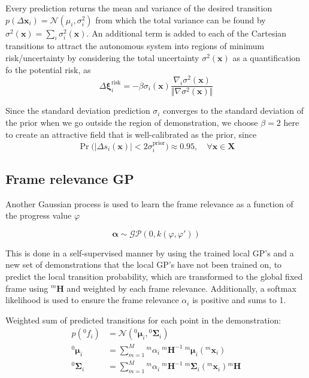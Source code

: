 Every prediction returns the mean and variance of the desired transition \( p(\Delta \boldsymbol{x}_i) = \mathcal{N}(\mu_i, \sigma_i^2) \) from which the total variance can be found by \( \sigma^2(\boldsymbol{x}) = \sum_{i} \sigma_i^2(\boldsymbol{x}) \).
An additional term is added to each of the Cartesian transitions to attract the autonomous system into regions of minimum risk/uncertainty by considering the total uncertainty \( \sigma^2(\boldsymbol{x}) \) as a quantification fo the potential risk, as
\begin{equation}
    \Delta \boldsymbol{\xi}_i^{\text{risk}} = - \beta \sigma_i(\boldsymbol{x}) \frac{\nabla_i \sigma^2(\boldsymbol{x})}{\Vert \nabla \sigma^2(\boldsymbol{x}) \Vert}
\end{equation}

Since the standard deviation prediction \( \sigma_i \) converges to the standard deviation of the prior when we go outside the region of demonstration, we choose \( \beta = 2 \) here to create an attractive field that is well-calibrated as the prior, since
\begin{equation}
    \Pr \Big( \big\vert \Delta s_i(\boldsymbol{x}) \big\vert < 2 \sigma_i^\text{prior} \Big) \approx 0.95, \quad \forall \boldsymbol{x} \in \boldsymbol{X}
\end{equation}

\subsection{Frame relevance GP}\label{sec:frame-relevance-gp}

Another Gaussian process is used to learn the frame relevance as a function of the progress value \( \varphi \)

\begin{equation}
    \boldsymbol{\alpha} \sim \mathcal{GP}(0, k(\varphi, \varphi'))
\end{equation}

This is done in a self-supervised manner by using the trained local GP's and a new set of demonstrations that the local GP's have not been trained on, to predict the local transition probability, which are transformed to the global fixed frame using \( {}^{m}\boldsymbol{H} \) and weighted by each frame relevance.
Additionally, a softmax likelihood is used to ensure the frame relevance \( \alpha_i \) is positive and sums to 1.

Weighted sum of predicted transitions for each point in the demonstration:
\begin{align}
    p \left( {}^{0}f_i \right)
     & =
    \mathcal{N} \left( {}^{0}\boldsymbol{\mu}_i, {}^{0}\boldsymbol{\Sigma}_i \right)
    \\
    {}^{0}\boldsymbol{\mu}_i
     & =
    \sum_{m = 1}^M {}^{m}\alpha_i \ {}^{m}\boldsymbol{H}^{-1} \ {}^{m}\boldsymbol{\mu}_i \left( {}^{m}\boldsymbol{x}_i \right)
    \\
    {}^{0}\boldsymbol{\Sigma}_i
     & =
    \sum_{m = 1}^M {}^{m}\alpha_i \ {}^{m}\boldsymbol{H}^{-1} \ {}^{m}\boldsymbol{\Sigma}_i \left( {}^{m}\boldsymbol{x}_i \right) {}^{m}\boldsymbol{H}
\end{align}

